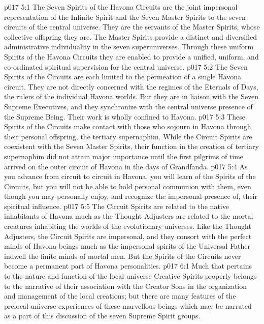 \vs p017 5:1 The Seven Spirits of the Havona Circuits are the joint impersonal representation of the Infinite Spirit and the Seven Master Spirits to the seven circuits of the central universe. They are the servants of the Master Spirits, whose collective offspring they are. The Master Spirits provide a distinct and diversified administrative individuality in the seven superuniverses. Through these uniform Spirits of the Havona Circuits they are enabled to provide a unified, uniform, and co\hyp{}ordinated spiritual supervision for the central universe.
\vs p017 5:2 The Seven Spirits of the Circuits are each limited to the permeation of a single Havona circuit. They are not directly concerned with the regimes of the Eternals of Days, the rulers of the individual Havona worlds. But they are in liaison with the Seven Supreme Executives, and they synchronize with the central universe presence of the Supreme Being. Their work is wholly confined to Havona.
\vs p017 5:3 These Spirits of the Circuits make contact with those who sojourn in Havona through their personal offspring, the tertiary supernaphim. While the Circuit Spirits are coexistent with the Seven Master Spirits, their function in the creation of tertiary supernaphim did not attain major importance until the first pilgrims of time arrived on the outer circuit of Havona in the days of Grandfanda.
\vs p017 5:4 As you advance from circuit to circuit in Havona, you will learn of the Spirits of the Circuits, but you will not be able to hold personal communion with them, even though you may personally enjoy, and recognize the impersonal presence of, their spiritual influence.
\vs p017 5:5 The Circuit Spirits are related to the native inhabitants of Havona much as the Thought Adjusters are related to the mortal creatures inhabiting the worlds of the evolutionary universes. Like the Thought Adjusters, the Circuit Spirits are impersonal, and they consort with the perfect minds of Havona beings much as the impersonal spirits of the Universal Father indwell the finite minds of mortal men. But the Spirits of the Circuits never become a permanent part of Havona personalities.
\vs p017 6:1 Much that pertains to the nature and function of the local universe Creative Spirits properly belongs to the narrative of their association with the Creator Sons in the organization and management of the local creations; but there are many features of the prelocal universe experiences of these marvellous beings which may be narrated as a part of this discussion of the seven Supreme Spirit groups.

